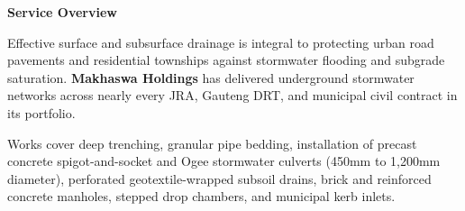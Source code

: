 \documentclass[a4paper,11pt]{article}
\begin{document}
\noindent
\begin{minipage}[t]{0.63\textwidth}
    \vspace{0pt}
    {\large\bfseries\color{mhnavy} Service Overview}
    \vspace{0.08cm}

    {\fontsize{8.7pt}{12.3pt}\selectfont\color{mhtext}
    Effective surface and subsurface drainage is integral to protecting urban road pavements and residential townships against stormwater flooding and subgrade saturation. \textbf{Makhaswa Holdings} has delivered underground stormwater networks across nearly every JRA, Gauteng DRT, and municipal civil contract in its portfolio.
    }

    \vspace{0.15cm}

    {\fontsize{8.7pt}{12.3pt}\selectfont\color{mhtext}
    Works cover deep trenching, granular pipe bedding, installation of precast concrete spigot-and-socket and Ogee stormwater culverts (450mm to 1,200mm diameter), perforated geotextile-wrapped subsoil drains, brick and reinforced concrete manholes, stepped drop chambers, and municipal kerb inlets.
    }
\end{minipage}
\hfill
\end{document}
